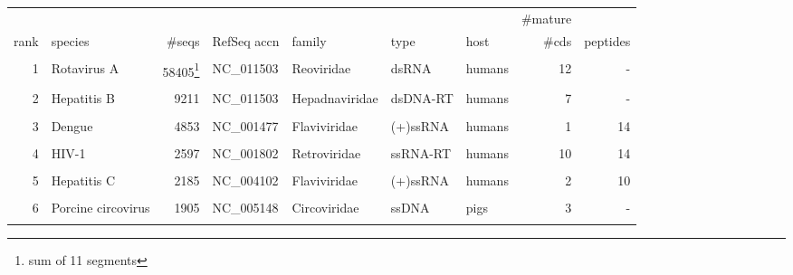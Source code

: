
\tiny
\begin{tabular}{r|l|r|l|l|l|l|r|r}
       &                    &              &                &          &        &       & \#mature \\ 
  rank & species            &       \#seqs & RefSeq accn    & family         & type     & host   & \#cds & peptides \\ \hline
       &                    &              &                &                &          &        &       &          \\ 
     1 & Rotavirus A        &      58405\footnote{sum of 11 segments}  & NC\_011503 & Reoviridae     & dsRNA    & humans &    12 &       -  \\
       &                    &              &                &                &          &        &       &          \\ 
     2 & Hepatitis B        &         9211 & NC\_011503      & Hepadnaviridae & dsDNA-RT & humans &     7 &       -  \\
       &                    &              &                &                &          &        &       &          \\ 
     3 & Dengue             &         4853 & NC\_001477      & Flaviviridae   & (+)ssRNA & humans &     1 &      14  \\
       &                    &              &                &                &          &        &       &          \\ 
     4 & HIV-1              &        2597  & NC\_001802      & Retroviridae   & ssRNA-RT & humans &    10 &      14  \\
       &                    &              &                &                &          &        &       &          \\ 
     5 & Hepatitis C        &        2185  & NC\_004102      & Flaviviridae   & (+)ssRNA & humans &     2 &      10  \\
       &                    &              &                &                &          &        &       &          \\ 
     6 & Porcine circovirus &        1905  & NC\_005148      & Circoviridae   & ssDNA    & pigs   &     3 &       -  \\
       &                    &              &                &                &          &        &       &          \\ 

\end{tabular}
